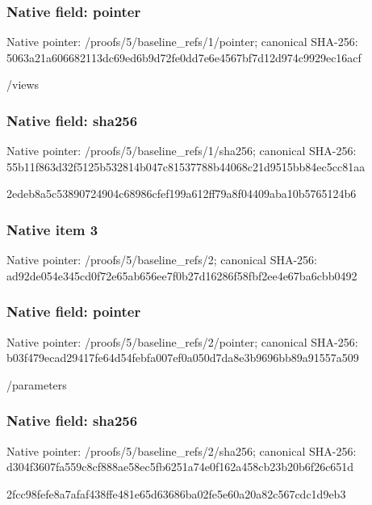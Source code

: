 \documentclass[10pt,a4paper]{article}
\begin{document}
\subsubsection{Native field: pointer}
Native pointer: /proofs/5/baseline\_\allowbreak{}refs/1/pointer; canonical SHA-256: 5063a21a606682113dc69ed6b9d72fe0dd7e6e4567bf7d12d974c9929ec16acf

\begingroup\raggedright\sloppy /\allowbreak{}views\par\endgroup

\subsubsection{Native field: sha256}
Native pointer: /proofs/5/baseline\_\allowbreak{}refs/1/sha256; canonical SHA-256: 55b11f863d32f5125b532814b047c81537788b44068c21d9515bb84ec5cc81aa

\begingroup\raggedright\sloppy 2edeb8a5c53890724904c68986cfef199a612ff79a8f04409aba10b5765124b6\par\endgroup

\subsubsection{Native item 3}
Native pointer: /proofs/5/baseline\_\allowbreak{}refs/2; canonical SHA-256: ad92de054e345cd0f72e65ab656ee7f0b27d16286f58fbf2ee4e67ba6cbb0492

\subsubsection{Native field: pointer}
Native pointer: /proofs/5/baseline\_\allowbreak{}refs/2/pointer; canonical SHA-256: b03f479ecad29417fe64d54febfa007ef0a050d7da8e3b9696bb89a91557a509

\begingroup\raggedright\sloppy /\allowbreak{}parameters\par\endgroup

\subsubsection{Native field: sha256}
Native pointer: /proofs/5/baseline\_\allowbreak{}refs/2/sha256; canonical SHA-256: d304f3607fa559c8cf888ae58ec5fb6251a74e0f162a458cb23b20b6f26c651d

\begingroup\raggedright\sloppy 2fcc98fefe8a7afaf438ffe481e65d63686ba02fe5e60a20a82c567cdc1d9eb3\par\endgroup
\end{document}
